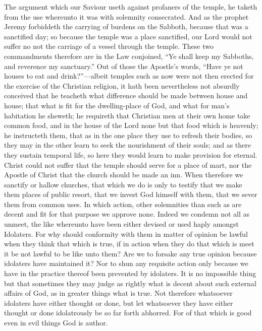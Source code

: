 The argument which our Saviour useth against profaners of the temple, he taketh from the use whereunto it was with solemnity consecrated. And as the prophet Jeremy forbiddeth the carrying of burdens on the Sabboth, because that was a sanctified day; so because the temple was a place sanctified, our Lord would not suffer no not the carriage of a vessel through the temple. These two commandments therefore are in the Law conjoined, “Ye shall keep my Sabboths, and reverence my sanctuary.”
Out of those the Apostle’s words, “Have ye not houses to eat and drink?”—albeit temples such as now were not then erected for the exercise of the Christian religion, it hath been nevertheless not absurdly conceived that he teacheth  what difference should be made between house and house; that what is fit for the dwelling-place of God, and what for man’s habitation he sheweth; he requireth that Christian men at their own home take common food, and in the house of the Lord none but that food which is heavenly; he instructeth them, that as in the one place they use to refresh their bodies, so they may in the other learn to seek the nourishment of their souls; and as there they sustain temporal life, so here they would learn to make provision for eternal. Christ could not suffer that the temple should serve for a place of mart, nor the Apostle of Christ that the church should be made an inn.
When therefore we sanctify or hallow churches, that which we do is only to testify that we make them places of public resort, that we invest God himself with them, that we sever them from common uses. In which action, other solemnities than such as are decent and fit for that purpose we approve none.
Indeed we condemn not all as unmeet, the like whereunto have been either devised or used haply amongst Idolaters. For why should conformity with them in matter of opinion be lawful when they think that which is true, if in action when they do that which is meet it be not lawful to be like unto them? Are we to forsake any true opinion because idolaters have maintained it? Nor to shun any requisite action only  because we have in the practice thereof been prevented by idolaters. It is no impossible thing but that sometimes they may judge as rightly what is decent about such external affairs of God, as in greater things what is true. Not therefore whatsoever idolaters have either thought or done, but let whatsoever they have either thought or done idolatrously be so far forth abhorred. For of that which is good even in evil things God is author.

